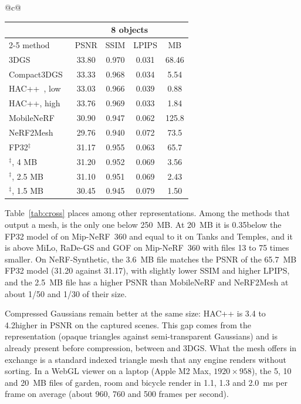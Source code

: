 \begin{table}[t]
\begin{tabular}[t]{@{}c@{}}
\begin{tabular}[t]{@{}lcccc@{}}
\toprule
 & \multicolumn{4}{c}{8 objects} \\
\cmidrule(lr){2-5}
method & PSNR & SSIM & LPIPS & MB \\
\midrule
3DGS~\cite{kerbl2023gaussians} & 33.80 & 0.970 & 0.031 & 68.46 \\
Compact3DGS~\cite{compact3dgs2024} & 33.33 & 0.968 & 0.034 & 5.54 \\
HAC++~\cite{hacpp2025}, low & 33.03 & 0.966 & 0.039 & 0.88 \\
HAC++, high & 33.76 & 0.969 & 0.033 & 1.84 \\
\midrule
MobileNeRF~\cite{mobilenerf2023} & 30.90 & 0.947 & 0.062 & 125.8 \\
NeRF2Mesh~\cite{nerf2mesh2023} & 29.76 & 0.940 & 0.072 & 73.5 \\
\MS FP32$^\ddagger$ & 31.17 & 0.955 & 0.063 & 65.7 \\
\midrule
\BM$^\ddagger$, 4 MB & 31.20 & 0.952 & 0.069 & 3.56 \\
\BM$^\ddagger$, 2.5 MB & 31.10 & 0.951 & 0.069 & 2.43 \\
\BM$^\ddagger$, 1.5 MB & 30.45 & 0.945 & 0.079 & 1.50 \\
\bottomrule
\end{tabular}
\end{tabular}
\end{table}

Table~\ref{tab:cross} places \BM among other representations. Among the methods that output a mesh, \BM is the only one below 250~MB. At 20~MB it is 0.35\dB below the FP32 model of \MS on Mip-NeRF~360 and equal to it on Tanks and Temples, and it is above MiLo, RaDe-GS and GOF on Mip-NeRF~360 with files 13 to 75 times smaller. On NeRF-Synthetic, the 3.6~MB file matches the PSNR of the 65.7~MB FP32 model (31.20 against 31.17\dB), with slightly lower SSIM and higher LPIPS, and the 2.5~MB file has a higher PSNR than MobileNeRF and NeRF2Mesh at about 1/50 and 1/30 of their size.

Compressed Gaussians remain better at the same size: HAC++ is 3.4 to 4.2\dB higher in PSNR on the captured scenes. This gap comes from the representation (opaque triangles against semi-transparent Gaussians) and is already present before compression, between \MS and 3DGS. What the mesh offers in exchange is a standard indexed triangle mesh that any engine renders without sorting. In a WebGL viewer on a laptop (Apple M2 Max, $1920 \times 958$), the 5, 10 and 20~MB files of garden, room and bicycle render in 1.1, 1.3 and 2.0~ms per frame on average (about 960, 760 and 500 frames per second).

